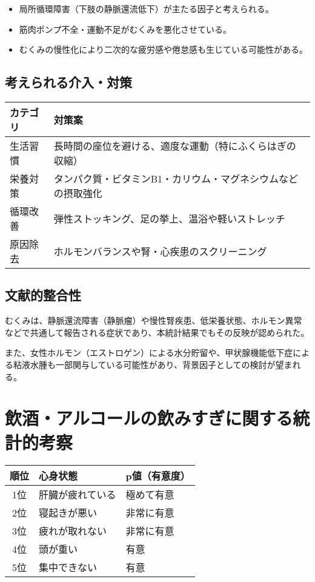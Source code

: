 \documentclass[a4paper,12pt]{article}
\begin{document}
\begin{itemize}
  \item 局所循環障害（下肢の静脈還流低下）が主たる因子と考えられる。
  \item 筋肉ポンプ不全・運動不足がむくみを悪化させている。
  \item むくみの慢性化により二次的な疲労感や倦怠感も生じている可能性がある。
\end{itemize}

\subsection*{考えられる介入・対策}

\begin{table}[H]
\centering
\begin{tabular}{|l|p{10cm}|}
\hline
カテゴリ & 対策案 \\
\hline
生活習慣 & 長時間の座位を避ける、適度な運動（特にふくらはぎの収縮） \\
栄養対策 & タンパク質・ビタミンB1・カリウム・マグネシウムなどの摂取強化 \\
循環改善 & 弾性ストッキング、足の挙上、温浴や軽いストレッチ \\
原因除去 & ホルモンバランスや腎・心疾患のスクリーニング \\
\hline
\end{tabular}
\end{table}

\subsection*{文献的整合性}

むくみは、静脈還流障害（静脈瘤）や慢性腎疾患、低栄養状態、ホルモン異常などで共通して報告される症状であり、本統計結果でもその反映が認められた。

また、女性ホルモン（エストロゲン）による水分貯留や、甲状腺機能低下症による粘液水腫も一部関与している可能性があり、背景因子としての検討が望まれる。

\section{飲酒・アルコールの飲みすぎに関する統計的考察}

\begin{table}[H]
\centering
\begin{tabular}{|c|l|l|}
\hline
順位 & 心身状態 & p値（有意度） \\
\hline
1位 & 肝臓が疲れている & 極めて有意 \\
2位 & 寝起きが悪い & 非常に有意 \\
3位 & 疲れが取れない & 非常に有意 \\
4位 & 頭が重い & 有意 \\
5位 & 集中できない & 有意 \\
\hline
\end{tabular}
\end{table}
\end{document}
